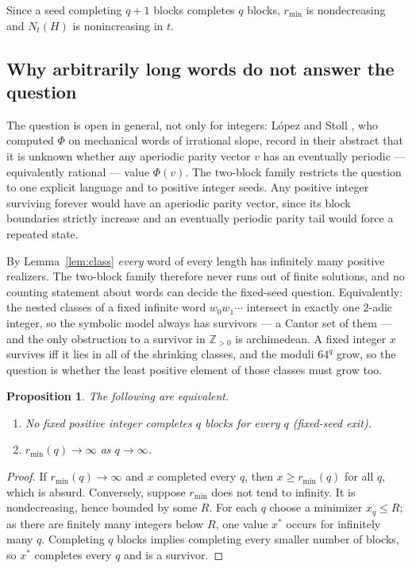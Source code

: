 \documentclass[11pt,a4paper]{article}
\theoremstyle{plain}
\newtheorem{proposition}[theorem]{Proposition}
\theoremstyle{definition}
\theoremstyle{remark}
\newcommand{\Zpos}{\mathbb{Z}_{>0}}
\begin{document}
Since a seed completing $q+1$ blocks completes $q$ blocks, $r_{\min}$ is
nondecreasing and $N_t(H)$ is nonincreasing in $t$.

\subsection{Why arbitrarily long words do not answer the question}

The question is open in general, not only for integers: L\'opez and Stoll
\cite{LopezStoll2009}, who computed $\Phi$ on mechanical words of irrational
slope, record in their abstract that it is unknown whether any aperiodic parity
vector $v$ has an eventually periodic --- equivalently rational --- value
$\Phi(v)$. The two-block family restricts the question to one explicit
language and to positive integer seeds. Any positive integer surviving forever
would have an aperiodic parity vector, since its block boundaries strictly
increase and an eventually periodic parity tail would force a repeated state.

By Lemma~\ref{lem:class} \emph{every} word of every length has infinitely many
positive realizers. The two-block family therefore never runs out of finite
solutions, and no counting statement about words can decide the fixed-seed
question. Equivalently: the nested classes of a fixed infinite word
$w_0w_1\cdots$ intersect in exactly one $2$-adic integer, so the symbolic model
always has survivors --- a Cantor set of them --- and the only obstruction to a
survivor in $\Zpos$ is archimedean. A fixed integer $x$ survives iff it lies in
all of the shrinking classes, and the moduli $64^q$ grow, so the question is
whether the least positive element of those classes must grow too.

\begin{proposition}\label{prop:equiv}
The following are equivalent.
\begin{enumerate}
\item No fixed positive integer completes $q$ blocks for every $q$
      (\emph{fixed-seed exit}).
\item $r_{\min}(q)\to\infty$ as $q\to\infty$.
\end{enumerate}
\end{proposition}

\begin{proof}
If $r_{\min}(q)\to\infty$ and $x$ completed every $q$, then $x\ge r_{\min}(q)$
for all $q$, which is absurd. Conversely, suppose $r_{\min}$ does not tend to
infinity. It is nondecreasing, hence bounded by some $R$. For each $q$ choose a
minimizer $x_q\le R$; as there are finitely many integers below $R$, one value
$x^\ast$ occurs for infinitely many $q$. Completing $q$ blocks implies
completing every smaller number of blocks, so $x^\ast$ completes every $q$ and
is a survivor.
\end{proof}
\end{document}
